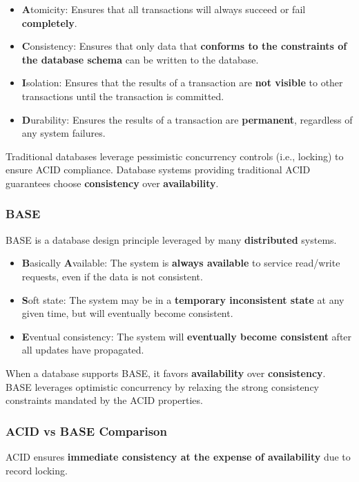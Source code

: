 \documentclass[12pt,a4paper]{report}
\begin{document}
\begin{itemize}
  \item \textbf{A}tomicity: Ensures that all transactions will always succeed or fail \textbf{completely}.
  \item \textbf{C}onsistency: Ensures that only data that \textbf{conforms to the constraints of the database schema} can be written to the database.
  \item \textbf{I}solation: Ensures that the results of a transaction are \textbf{not visible} to other transactions until the transaction is committed.
  \item \textbf{D}urability: Ensures the results of a transaction are \textbf{permanent}, regardless of any system failures.
\end{itemize}

Traditional databases leverage pessimistic concurrency controls (i.e., locking) to ensure ACID compliance. Database systems providing traditional ACID guarantees choose \textbf{consistency} over \textbf{availability}.

\subsubsection{BASE}
BASE is a database design principle leveraged by many \textbf{distributed} systems.

\begin{itemize}
  \item \textbf{B}asically \textbf{A}vailable: The system is \textbf{always available} to service read/write requests, even if the data is not consistent.
  \item \textbf{S}oft state: The system may be in a \textbf{temporary inconsistent state} at any given time, but will eventually become consistent.
  \item \textbf{E}ventual consistency: The system will \textbf{eventually become consistent} after all updates have propagated.
\end{itemize}

When a database supports BASE, it favors \textbf{availability} over \textbf{consistency}. BASE leverages optimistic concurrency by relaxing the strong consistency constraints mandated by the ACID properties.

\subsubsection{ACID vs BASE Comparison}
ACID ensures \textbf{immediate consistency at the expense of availability} due to record locking. 
\end{document}
